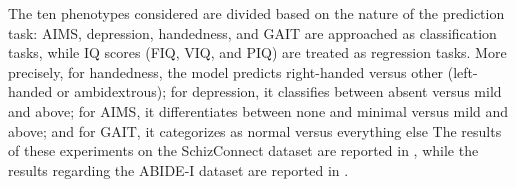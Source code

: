 \begin{table*}[!b]
    \centering
    \caption[Assessment Scores Results on SchizConnect]{Results of assessment scores/phenotypes prediction from brain MRIs on the SchizConnect dataset.}
\end{table*}

The ten phenotypes considered are divided based on the nature of the prediction
task: AIMS, depression, handedness, and GAIT are approached as classification
tasks, while IQ scores (FIQ, VIQ, and PIQ) are treated as regression tasks. More
precisely, for handedness, the model predicts right-handed versus other
(left-handed or ambidextrous); for depression, it classifies between absent
versus mild and above; for AIMS, it differentiates between none and minimal
versus mild and above; and for GAIT, it categorizes as normal versus everything
else The results of these experiments on the SchizConnect dataset are reported
in , while the results regarding the ABIDE-I dataset
are reported in .


